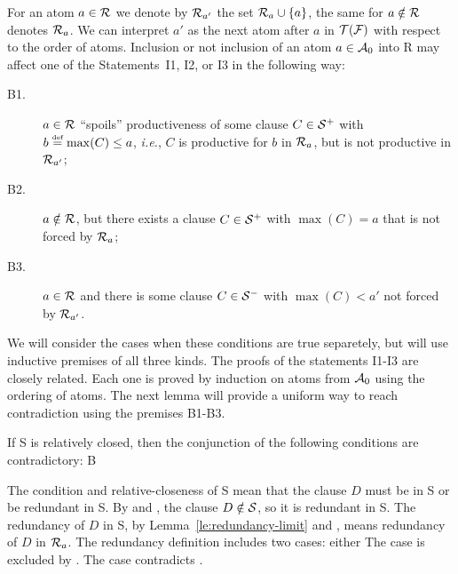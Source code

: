 For an atom
\(a\in\mbox{$\cal R$}\) we denote by \(\mbox{$\cal R$}_{a'}\) the set \(\mbox{$\cal R$}_a\cup\{a\}\), the same for
\(a\notin\mbox{$\cal R$}\) denotes \(\mbox{$\cal R$}_a\). We can interpret \(a'\) as the next atom
after \(a\) in ${\cal T}({\cal F})$ with respect to the order of atoms.
Inclusion or not inclusion  of an atom \(a\in\mbox{$\cal A$}_0\) into \C R may affect
 one of the Statements~I1, I2, or I3 in the following way:
\begin{description}
\item[B1.] $a\in \mbox{$\cal R$}$ ``spoils'' productiveness of
some clause \(C\in{\cal S}^{+}\) with \(b\mathrel{\stackrel{\mbox{\tiny def}}{=}}\max (C) \leq a\), {\em i.e.}, $C$ is productive for
$b$ in \(\mbox{$\cal R$}_a\), but is not productive in \(\mbox{$\cal R$}_{a'}\);
\item[B2.] $a\notin\mbox{$\cal R$}$, but there exists a clause \(C\in{\cal S}^{+}\)
with \(\max (C)=a\) that is not forced by \(\mbox{$\cal R$}_{a}\);
\item[B3.] $a\in \mbox{$\cal R$}$ and there is some clause \(C\in{\cal S}^{-}\) with
\(\max (C)<a'\) not forced by \(\mbox{$\cal R$}_{a'}\).
\end{description}
We will consider the cases when these conditions are true separetely, but
will use inductive premises of all three kinds. 
  The proofs of the statements I1-I3 are closely related. Each one
is proved by induction on atoms from \(\mbox{$\cal A$}_0\) using the ordering of atoms. 
 The next lemma
will provide a uniform way to reach contradiction using the premises B1-B3.

\begin{LEMMA}\label {le:contradiction-way}
If \C S is relatively closed, then the conjunction of the following conditions
are contradictory:
\newITEM B 
\end{LEMMA}
\begin{PROOF}
The condition  and relative-closeness of \C S mean that the clause $D$
must be in \C S or be redundant in \C S. 
By   and , the
clause \(D\notin\mbox{$\cal S$}\), so it is redundant in \C S. The
redundancy of $D$ in \C S, by Lemma~\ref {le:redundancy-limit} and , means
redundancy of $D$ in \(\mbox{$\cal R$}_a\). The redundancy definition includes two cases:
either
 The case  is excluded by . The case  
contradicts .
\end{PROOF}


